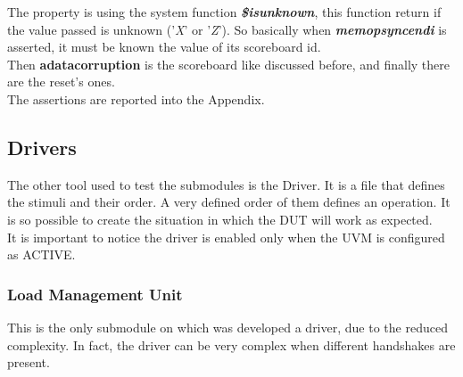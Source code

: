 The property is using the system function \textbf{\emph{\$isunknown}}, this function return if the value passed is unknown ('\emph{X}' or '\emph{Z}'). So basically when \textbf{\emph{memop\+sync\+end\+i}} is asserted, it must be known the value of its scoreboard id.\\


Then  \textbf{a\+data\+corruption} is the scoreboard like discussed before, and finally there are the reset's ones.\\
The assertions are reported into the Appendix.\\




\subsection{Drivers}
The other tool used to test the submodules is the Driver. It is a file that defines the stimuli and their order. A very defined order of them defines an operation. It is so possible to create the situation in which the DUT will work as expected.\\

It is important to notice the driver is enabled only when the UVM is configured as ACTIVE.

\subsubsection{Load Management Unit}
This is the only submodule on which was developed a driver, due to the reduced complexity. In fact, the driver can be very complex when different handshakes are present.\\

